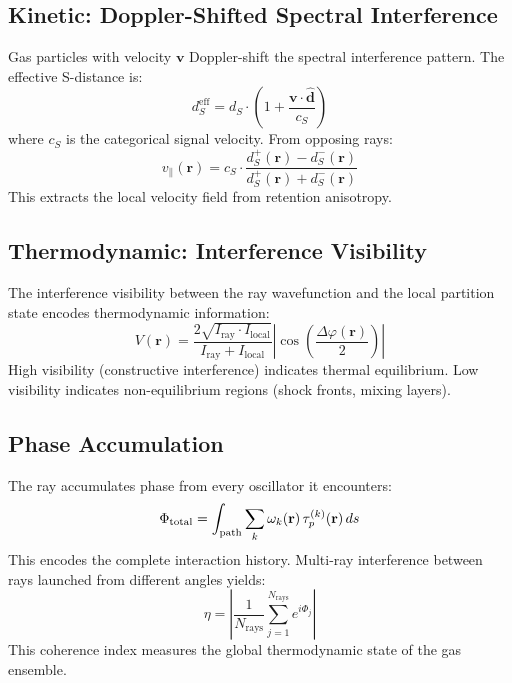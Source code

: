 \subsection{Kinetic: Doppler-Shifted Spectral Interference}

Gas particles with velocity $\mathbf{v}$ Doppler-shift the spectral interference pattern. The effective S-distance is:
\begin{equation}
    d_S^{\mathrm{eff}} = d_S \cdot \left(1 + \frac{\mathbf{v} \cdot \hat{\mathbf{d}}}{c_S}\right)
\end{equation}
where $c_S$ is the categorical signal velocity. From opposing rays:
\begin{equation}
    v_{\parallel}(\mathbf{r}) = c_S \cdot \frac{d_S^+({\mathbf{r}}) - d_S^-(\mathbf{r})}{d_S^+(\mathbf{r}) + d_S^-(\mathbf{r})}
\end{equation}
This extracts the local velocity field from retention anisotropy.

\subsection{Thermodynamic: Interference Visibility}

The interference visibility between the ray wavefunction and the local partition state encodes thermodynamic information:
\begin{equation}
    V(\mathbf{r}) = \frac{2\sqrt{I_{\mathrm{ray}} \cdot I_{\mathrm{local}}}}{I_{\mathrm{ray}} + I_{\mathrm{local}}} \left|\cos\!\left(\frac{\Delta\varphi(\mathbf{r})}{2}\right)\right|
\end{equation}
High visibility (constructive interference) indicates thermal equilibrium. Low visibility indicates non-equilibrium regions (shock fronts, mixing layers).

\subsection{Phase Accumulation}

The ray accumulates phase from every oscillator it encounters:
\begin{equation}
    \Phi_{\mathrm{total}} = \int_{\mathrm{path}} \sum_k \omega_k(\mathbf{r})\, \tau_p^{(k)}(\mathbf{r})\, ds
\end{equation}
This encodes the complete interaction history. Multi-ray interference between rays launched from different angles yields:
\begin{equation}
    \eta = \left|\frac{1}{N_{\mathrm{rays}}} \sum_{j=1}^{N_{\mathrm{rays}}} e^{i\Phi_j}\right|
\end{equation}
This coherence index measures the global thermodynamic state of the gas ensemble.

